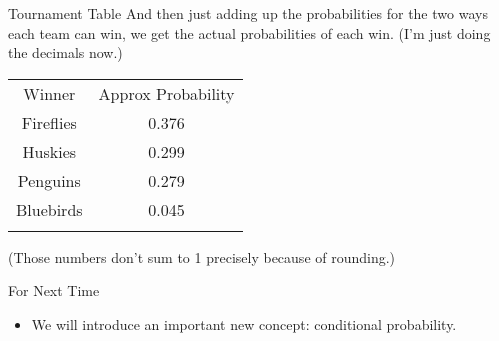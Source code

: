 \documentclass[
  ignorenonframetext,
]{beamer}
\providecommand{\tightlist}{%
  \setlength{\itemsep}{0pt}\setlength{\parskip}{0pt}}
\renewcommand{\,}{\text{, }}
\begin{document}
\begin{frame}{Tournament Table}
\protect\hypertarget{tournament-table-2}{}
And then just adding up the probabilities for the two ways each team can
win, we get the actual probabilities of each win. (I'm just doing the
decimals now.)

\begin{longtable}[]{@{}cc@{}}
\toprule
Winner & Approx Probability \\ \addlinespace
\midrule
\endhead
Fireflies & 0.376 \\ \addlinespace
Huskies & 0.299 \\ \addlinespace
Penguins & 0.279 \\ \addlinespace
Bluebirds & 0.045 \\ \addlinespace
\bottomrule
\end{longtable}

(Those numbers don't sum to 1 precisely because of rounding.)
\end{frame}

\begin{frame}{For Next Time}
\protect\hypertarget{for-next-time}{}
\begin{itemize}
\tightlist
\item
  We will introduce an important new concept: conditional probability.
\end{itemize}
\end{frame}
\end{document}
